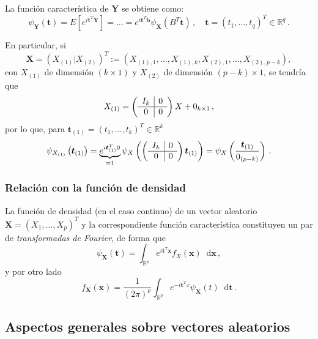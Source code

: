 \begin{nprop}
  La función característica de $\boldsymbol Y$ se obtiene como:
  \[
  \psi_{\boldsymbol Y}(\boldsymbol t) = E\left[e^{i\boldsymbol t^T \boldsymbol Y}\right] = \dots = e^{i\boldsymbol t^T \boldsymbol b} \psi_{\boldsymbol X}(B^T \boldsymbol t)\,, \quad \boldsymbol t = (t_1,\dots,t_q)^T \in \mathbb R^q\,.
  \]
\end{nprop}
  En particular, si \[\boldsymbol X= \left( X_{(1)} | X_{(2)}\right)^T := (X_{(1),1}, \dots, X_{(1),k}, X_{(2),1}, \dots, X_{(2),p-k}),\] con $X_{(1)}$ de dimensión $(k\times1)$ y $X_{(2)}$ de dimensión $(p-k) \times 1$, se tendría que
  \[
X_{(1)} = \left(\begin{array}{c | c}
    I_k & 0 \\ \hline
    0 & 0
        \end{array}\right)X + 0_{k\times 1}\,,
\]
por lo que, para $\boldsymbol t_{(1)} = (t_1,\dots,t_k)^T \in \mathbb R^k$
\[
\psi_{X_{(1)}}\left(\boldsymbol t_{(1)}\right) = \underbrace{e^{i\boldsymbol t_{(1)}^T 0}}_{=1} \psi_X\left(\left(\begin{array}{c | c}
    I_k & 0 \\ \hline
    0 & 0
        \end{array}\right)\boldsymbol t_{(1)}\right) = \psi_X\left(\frac{\boldsymbol t_{(1)}}{0_{(p-k)}}\right)\,.
\]

\subsubsection{Relación con la función de densidad}

La función de densidad (en el caso continuo) de un vector aleatorio $\boldsymbol X = (X_1,\dots,X_p)^T$ y la correspondiente función característica constituyen un par de \emph{transformadas de Fourier}, de forma que
\[
\psi_{\boldsymbol X}(\boldsymbol t) = \int_{\mathbb R ^p} e^{i \boldsymbol t^T \boldsymbol x} f_X(\boldsymbol x) \mathop{}\!\mathrm{d}\boldsymbol x\,,
\]
y por otro lado
\[
f_{\boldsymbol X}(\boldsymbol x) =  \dfrac{1}{(2\pi)^p} \int_{\mathbb R^p} e^{- i \boldsymbol t^T x} \psi_{\boldsymbol X}(t) \mathop{}\!\mathrm{d}\boldsymbol t\,.
\]


\subsection{Aspectos generales sobre vectores aleatorios}
